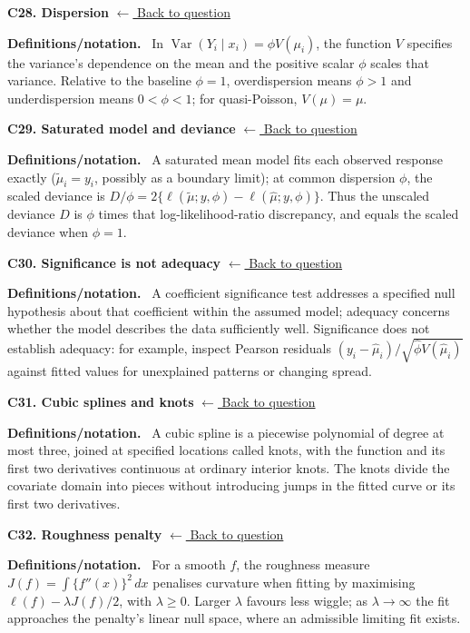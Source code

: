 \documentclass[11pt,a4paper]{article}
\newcommand{\concepttopic}[1]{%
  \par\addvspace{8pt}\noindent{\color{statblue}\bfseries #1}\par\nobreak\smallskip}
\newenvironment{conceptanswer}[2]
  {\par\addvspace{10pt}\noindent\begin{minipage}{\linewidth}%
   \hypertarget{concept-answer:#1}{}%
   \textcolor{statblue}{\textbf{C#1. #2}}\hfill%
   {\footnotesize\hyperlink{concept-question:#1}{$\leftarrow$ Back to question}}%
   \par\smallskip\textbf{Definitions/notation.}\ }
  {\end{minipage}\par}
\begin{document}
\begin{conceptanswer}{28}{Dispersion}
In $\operatorname{Var}(Y_i\mid x_i)=\phi V(\mu_i)$, the function $V$
specifies the variance's dependence on the mean and the positive scalar
$\phi$ scales that variance.
Relative to the baseline $\phi=1$, overdispersion means $\phi>1$ and
underdispersion means $0<\phi<1$; for quasi-Poisson, $V(\mu)=\mu$.
\end{conceptanswer}

\begin{conceptanswer}{29}{Saturated model and deviance}
A saturated mean model fits each observed response exactly
($\tilde\mu_i=y_i$, possibly as a boundary limit); at common dispersion
$\phi$, the scaled deviance is
$D/\phi=2\{\ell(\tilde\mu;y,\phi)-\ell(\hat\mu;y,\phi)\}$.
Thus the unscaled deviance $D$ is $\phi$ times that
log-likelihood-ratio discrepancy, and equals the scaled deviance when
$\phi=1$.
\end{conceptanswer}

\begin{conceptanswer}{30}{Significance is not adequacy}
A coefficient significance test addresses a specified null hypothesis
about that coefficient within the assumed model; adequacy concerns
whether the model describes the data sufficiently well.
Significance does not establish adequacy: for example, inspect Pearson
residuals $(y_i-\hat\mu_i)/\sqrt{\hat\phi V(\hat\mu_i)}$ against fitted
values for unexplained patterns or changing spread.
\end{conceptanswer}

\concepttopic{Splines and GAMs}
\begin{conceptanswer}{31}{Cubic splines and knots}
A cubic spline is a piecewise polynomial of degree at most three,
joined at specified locations called knots, with the function and its
first two derivatives continuous at ordinary interior knots.
The knots divide the covariate domain into pieces without introducing
jumps in the fitted curve or its first two derivatives.
\end{conceptanswer}

\begin{conceptanswer}{32}{Roughness penalty}
For a smooth $f$, the roughness measure
$J(f)=\int\{f''(x)\}^2\,dx$ penalises curvature when fitting by
maximising $\ell(f)-\lambda J(f)/2$, with $\lambda\ge0$.
Larger $\lambda$ favours less wiggle; as $\lambda\to\infty$ the fit
approaches the penalty's linear null space, where an admissible
limiting fit exists.
\end{conceptanswer}
\end{document}
